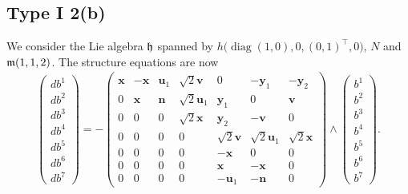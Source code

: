\documentclass[11pt]{article}
\numberwithin{equation}{section}
\newcommand\fh{{\frak h}}
\newcommand\fm{{\frak m}}
\newcommand\bx{{\mathbf x}}
\newcommand\bu{{\mathbf u}}
\newcommand\by{{\mathbf y}}
\newcommand\bn{{\mathbf n}}
\newcommand\bv{{\mathbf v}}
\newcommand{\diag}{\operatorname{diag}}
\begin{document}
\subsection{Type I 2(b)}
We consider the Lie algebra $\fh$ spanned by $h\big(\diag(1,0),0,(0,1)^\top,0\big)$, $N$ and $\fm(1,1,2)$.
The structure equations are now
\begin{gather}\label{EI2(b)}\left(\begin{matrix} db^1\\db^2\\db^3\\db^4\\db^5\\db^6\\db^7\end{matrix}\right) = -\left(
\begin{matrix}
{\bx} &-\bx&\bu_1&\sqrt2 \bv&0&-\by_1&-\by_2\\
0&\bx&\bn&\sqrt2 \bu_1&\by_1&0&\bv\\
0&0&0&\sqrt 2 \bx&\by_2&-\bv&0\\
0&0&0&0&\sqrt2\bv&\sqrt2 \bu_1&\sqrt 2 \bx\\
0&0&0&0&-\bx&0&0\\
0&0&0&0&\bx&-\bx&0\\
0&0&0&0&-\bu_1&-\bn&0
\end{matrix}\right) \wedge \left(\begin{matrix} b^1\\b^2\\b^3\\b^4\\b^5\\b^6\\b^7\end{matrix}\right).
\end{gather}
\end{document}
